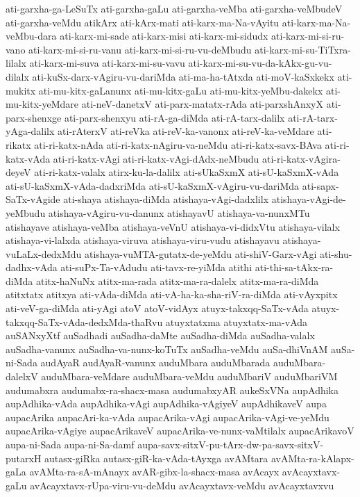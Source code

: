 {ati-garxha-ga-LeSuTx
ati-garxha-gaLu
ati-garxha-veMba
ati-garxha-veMbudeV
ati-garxha-veMdu
atikArx
ati-kArx-mati
ati-karx-ma-Na-vAyitu
ati-karx-ma-Na-veMbu-dara
ati-karx-mi-sade
ati-karx-misi
ati-karx-mi-sidudx
ati-karx-mi-si-ru-vano
ati-karx-mi-si-ru-vanu
ati-karx-mi-si-ru-vu-deMbudu
ati-karx-mi-su-TiTxra-lilalx
ati-karx-mi-suva
ati-karx-mi-su-vavu
ati-karx-mi-su-vu-da-kAkx-gu-vu-dilalx
ati-kuSx-darx-vAgiru-vu-dariMda
ati-ma-ha-tAtxda
ati-moV-kaSxkekx
ati-mukitx
ati-mu-kitx-gaLanunx
ati-mu-kitx-gaLu
ati-mu-kitx-yeMbu-dakekx
ati-mu-kitx-yeMdare
ati-neV-danetxV
ati-parx-matatx-rAda
ati-parxshAnxyX
ati-parx-shenxge
ati-parx-shenxyu
ati-rA-ga-diMda
ati-rA-tarx-dalilx
ati-rA-tarx-yAga-dalilx
ati-rAterxV
ati-reVka
ati-reV-ka-vanonx
ati-reV-ka-veMdare
ati-rikatx
ati-ri-katx-nAda
ati-ri-katx-nAgiru-va-neMdu
ati-ri-katx-savx-BAva
ati-ri-katx-vAda
ati-ri-katx-vAgi
ati-ri-katx-vAgi-dAdx-neMbudu
ati-ri-katx-vAgira-deyeV
ati-ri-katx-valalx
atirx-ku-la-dalilx
ati-sUkaSxmX
ati-sU-kaSxmX-vAda
ati-sU-kaSxmX-vAda-dadxriMda
ati-sU-kaSxmX-vAgiru-vu-dariMda
ati-sapx-SaTx-vAgide
ati-shaya
atishaya-diMda
atishaya-vAgi-dadxlilx
atishaya-vAgi-de-yeMbudu
atishaya-vAgiru-vu-danunx
atishayavU
atishaya-va-nunxMTu
atishayave
atishaya-veMba
atishaya-veVnU
atishaya-vi-didxVtu
atishaya-vilalx
atishaya-vi-lalxda
atishaya-viruva
atishaya-viru-vudu
atishayavu
atishaya-vuLaLx-dedxMdu
atishaya-vuMTA-gutatx-de-yeMdu
ati-shiV-Garx-vAgi
ati-shu-dadhx-vAda
ati-suPx-Ta-vAdudu
ati-tavx-re-yiMda
atithi
ati-thi-sa-tAkx-ra-diMda
atitx-haNuNx
atitx-ma-rada
atitx-ma-ra-dalelx
atitx-ma-ra-diMda
atitxtatx
atitxya
ati-vAda-diMda
ati-vA-ha-ka-sha-riV-ra-diMda
ati-vAyxpitx
ati-veV-ga-diMda
ati-yAgi
atoV
atoV-vidAyx
atuyx-takxqq-SaTx-vAda
atuyx-takxqq-SaTx-vAda-dedxMda-thaRvu
atuyxtatxma
atuyxtatx-ma-vAda
auSANxyXtf
auSadhadi
auSadha-daMte
auSadha-diMda
auSadha-valalx
auSadha-vanunx
auSadha-va-nunx-koTuTx
auSadha-veMdu
auSa-dhiVnAM
auSa-ni-Sada
audAyaR
audAyaR-vanunx
auduMbara
auduMbarada
auduMbara-dalelxV
auduMbara-veMdare
auduMbara-veMdu
auduMbariV
auduMbariVM
audumabxra
audumabx-ra-shacx-masa
audumabxyAR
aukeSxVNa
aupAdhika
aupAdhika-vAda
aupAdhika-vAgi
aupAdhika-vAgiyeV
aupAdhikaveV
aupa
aupacArika
aupacAri-ka-vAda
aupacArika-vAgi
aupacArika-vAgi-ve-yeMdu
aupacArika-vAgiye
aupacArikaveV
aupacArika-ve-nunx-vaMtilalx
aupacArikavoV
aupa-ni-Sada
aupa-ni-Sa-damf
aupa-savx-sitxV-pu-tArx-dw-pa-savx-sitxV-putarxH
autasx-giRka
autasx-giR-ka-vAda-tAyxga
avAMtara
avAMta-ra-kAlapx-gaLa
avAMta-ra-sA-mAnayx
avAR-gibx-la-shacx-masa
avAcayx
avAcayxtavx-gaLu
avAcayxtavx-rUpa-viru-vu-deMdu
avAcayxtavx-veMdu
avAcayxtavxvu
}
